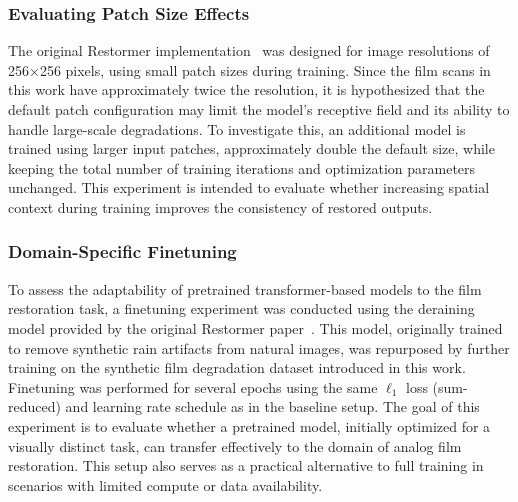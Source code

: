 \documentclass[10pt,a4paper,twocolumn,twoside]{article}
\begin{document}
\subsubsection{Evaluating Patch Size Effects}
The original Restormer implementation~\cite{restormer} was designed for image resolutions of 256×256 pixels, using small patch sizes during training. Since the film scans in this work have approximately twice the resolution, it is hypothesized that the default patch configuration may limit the model's receptive field and its ability to handle large-scale degradations. To investigate this, an additional model is trained using larger input patches, approximately double the default size, while keeping the total number of training iterations and optimization parameters unchanged. This experiment is intended to evaluate whether increasing spatial context during training improves the consistency of restored outputs.

\subsubsection{Domain-Specific Finetuning}

To assess the adaptability of pretrained transformer-based models to the film restoration task, a finetuning experiment was conducted using the deraining model provided by the original Restormer paper~\cite{restormer}. This model, originally trained to remove synthetic rain artifacts from natural images, was repurposed by further training on the synthetic film degradation dataset introduced in this work. \\
Finetuning was performed for several epochs using the same $\ell_1$ loss (sum-reduced) and learning rate schedule as in the baseline setup. The goal of this experiment is to evaluate whether a pretrained model, initially optimized for a visually distinct task, can transfer effectively to the domain of analog film restoration. This setup also serves as a practical alternative to full training in scenarios with limited compute or data availability.
\end{document}
